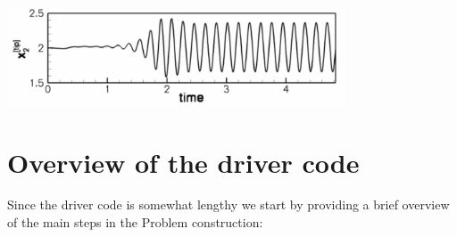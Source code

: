  
\begin{DoxyImage}
\includegraphics[width=0.75\textwidth]{fsi3_trace_cropped}
\end{DoxyImage}




 

\hypertarget{index_overview}{}\section{Overview of the driver code}\label{index_overview}
Since the driver code is somewhat lengthy we start by providing a brief overview of the main steps in the {\ttfamily Problem} construction\+:
